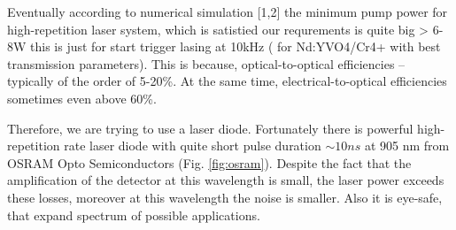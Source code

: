 Eventually according to numerical simulation [1,2] the minimum pump power for high-repetition laser system, which is satistied our requrements is quite big > 6-8W this is just for start trigger lasing at 10kHz ( for Nd:YVO4/Cr4+ with best transmission parameters). This is because, optical-to-optical efficiencies – typically of the order of 5-20\%.
At the same time, electrical-to-optical efficiencies sometimes even above 60\%.

Therefore, we are trying to use a laser diode. Fortunately there is powerful high-repetition rate laser diode with quite short pulse duration $\sim 10ns$ at 905 nm from OSRAM Opto Semiconductors (Fig. \ref{fig:osram}).
Despite the fact that the amplification of the detector at this wavelength is small,
the laser power exceeds these losses, moreover at this wavelength the noise is smaller. 
Also it is eye-safe, that expand spectrum of possible applications.

\begin{figure}
\begin{floatrow}
\end{floatrow}
\end{figure}





